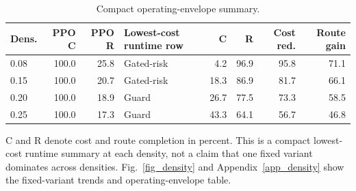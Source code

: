 
\begin{table}[!htbp]
\centering
\caption{Compact operating-envelope summary.}
\label{tab_density_summary}
\scriptsize
\setlength{\tabcolsep}{2.4pt}
\renewcommand{\arraystretch}{1.08}
\begin{tabular}{@{}lrrlrrrr@{}}
\toprule
Dens. & PPO C & PPO R & Lowest-cost runtime row & C & R & Cost red. & Route gain \\
\midrule
0.08 & 100.0 & 25.8 & Gated-risk & 4.2 & 96.9 & 95.8 & 71.1 \\
0.15 & 100.0 & 20.7 & Gated-risk & 18.3 & 86.9 & 81.7 & 66.1 \\
0.20 & 100.0 & 18.9 & Guard & 26.7 & 77.5 & 73.3 & 58.5 \\
0.25 & 100.0 & 17.3 & Guard & 43.3 & 64.1 & 56.7 & 46.8 \\
\bottomrule
\end{tabular}
\begin{tablenotes}
\item C and R denote cost and route completion in percent. This is a compact lowest-cost runtime summary at each density, not a claim that one fixed variant dominates across densities. Fig.~\ref{fig_density} and Appendix~\ref{app_density} show the fixed-variant trends and operating-envelope table.
\end{tablenotes}
\end{table}
